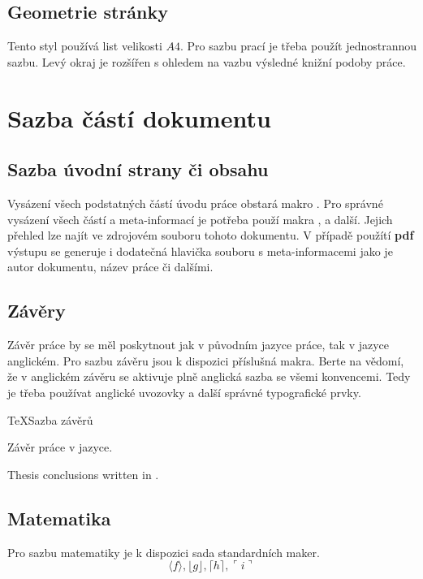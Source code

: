 \documentclass[
  program=itp,
  biblatex,
  figures=false,
  glossaries,
  index
]{kidiplom}
\begin{document}
\subsection{Geometrie stránky}
Tento styl používá list velikosti $A4$. Pro sazbu prací je třeba použít jednostrannou sazbu. Levý okraj je rozšířen s ohledem na vazbu výsledné knižní podoby práce.

\section{Sazba částí dokumentu}
\subsection{Sazba úvodní strany či obsahu}
Vysázení všech podstatných částí úvodu práce obstará makro . Pro správné vysázení všech částí a meta-informací je potřeba použí makra , \mbox{} a další. Jejich přehled lze najít ve zdrojovém souboru tohoto dokumentu. V případě použítí \textbf{pdf} výstupu se generuje i dodatečná hlavička souboru s meta-informacemi jako je autor dokumentu, název práce či dalšími.

\subsection{Závěry}
Závěr práce by se měl poskytnout jak v původním jazyce práce, tak v jazyce anglickém. Pro sazbu závěru jsou k dispozici příslušná makra. Berte na vědomí, že v anglickém závěru se aktivuje plně anglická sazba se všemi konvencemi. Tedy je třeba používat anglické uvozovky a další správné typografické prvky.

\begin{kicode}{TeX}{}{Sazba závěrů}
\begin{kiconclusions}
Závěr práce v  jazyce.
\end{kiconclusions}

\begin{kiconclusions}[english]
Thesis conclusions written in .
\end{kiconclusions}
\end{kicode}

\subsection{Matematika}
Pro sazbu matematiky je k dispozici sada standardních maker.
$$\langle f \rangle, \lfloor g \rfloor,
\lceil h \rceil, \ulcorner i \urcorner$$
\end{document}
